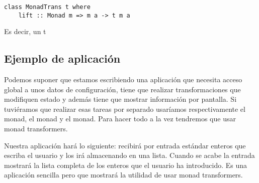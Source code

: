 \begin{verbatim}
class MonadTrans t where
    lift :: Monad m => m a -> t m a
\end{verbatim}
Es decir, un  t

\subsection{Ejemplo de aplicación}
Podemos suponer que estamos escribiendo una aplicación que necesita
acceso global a unos datos de configuración, tiene que realizar
transformaciones que modifiquen estado y además tiene que mostrar
información por pantalla. Si tuviéramos que realizar esas tareas
por separado usaríamos respectivamente el  monad,
el  monad y el  monad. Para hacer todo a la vez
tendremos que usar monad transformers.

Nuestra aplicación hará lo siguiente: recibirá por entrada estándar
enteros que escriba el usuario y los irá almacenando en una lista.
Cuando se acabe la entrada mostrará la lista completa de los enteros
que el usuario ha introducido. Es una aplicación sencilla pero que
mostrará la utilidad de usar monad transformers.

